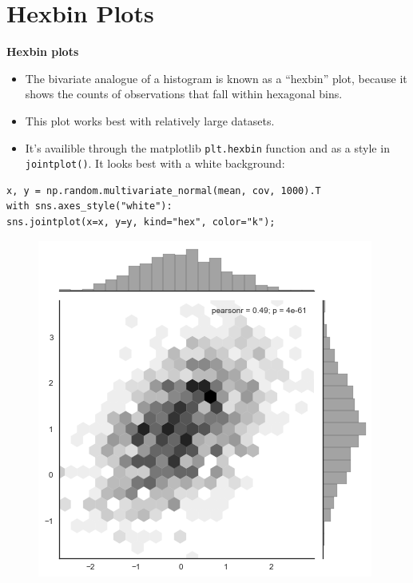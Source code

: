 \documentclass{beamer}
\begin{document}
\section{Hexbin Plots}
\begin{frame}[fragile]
\noindent \textbf{Hexbin plots}
\begin{itemize}
\item The bivariate analogue of a histogram is known as a “hexbin” plot, because it shows the counts of observations that fall within hexagonal bins. \item This plot works best with relatively large datasets. 
\item It’s availible through the matplotlib \texttt{plt.hexbin} function and as a style in \texttt{jointplot()}. It looks best with a white background:
\end{itemize}

\end{frame}
\begin{frame}[fragile]
\begin{verbatim}
x, y = np.random.multivariate_normal(mean, cov, 1000).T
with sns.axes_style("white"):
sns.jointplot(x=x, y=y, kind="hex", color="k");
\end{verbatim}

\begin{figure}
\centering
\includegraphics[width=0.7\linewidth]{images/distributions_32_0}

\end{figure}

\end{frame}
\end{document}
